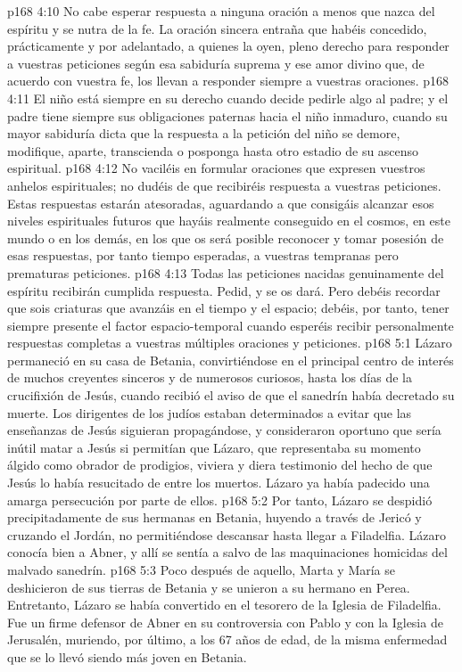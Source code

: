 \vs p168 4:10 No cabe esperar respuesta a ninguna oración a menos que nazca del espíritu y se nutra de la fe. La oración sincera entraña que habéis concedido, prácticamente y por adelantado, a quienes la oyen, pleno derecho para responder a vuestras peticiones según esa sabiduría suprema y ese amor divino que, de acuerdo con vuestra fe, los llevan a responder siempre a vuestras oraciones.
\vs p168 4:11 El niño está siempre en su derecho cuando decide pedirle algo al padre; y el padre tiene siempre sus obligaciones paternas hacia el niño inmaduro, cuando su mayor sabiduría dicta que la respuesta a la petición del niño se demore, modifique, aparte, transcienda o posponga hasta otro estadio de su ascenso espiritual.
\vs p168 4:12 No vaciléis en formular oraciones que expresen vuestros anhelos espirituales; no dudéis de que recibiréis respuesta a vuestras peticiones. Estas respuestas estarán atesoradas, aguardando a que consigáis alcanzar esos niveles espirituales futuros que hayáis realmente conseguido en el cosmos, en este mundo o en los demás, en los que os será posible reconocer y tomar posesión de esas respuestas, por tanto tiempo esperadas, a vuestras tempranas pero prematuras peticiones.
\vs p168 4:13 Todas las peticiones nacidas genuinamente del espíritu recibirán cumplida respuesta. Pedid, y se os dará. Pero debéis recordar que sois criaturas que avanzáis en el tiempo y el espacio; debéis, por tanto, tener siempre presente el factor espacio\hyp{}temporal cuando esperéis recibir personalmente respuestas completas a vuestras múltiples oraciones y peticiones.
\vs p168 5:1 Lázaro permaneció en su casa de Betania, convirtiéndose en el principal centro de interés de muchos creyentes sinceros y de numerosos curiosos, hasta los días de la crucifixión de Jesús, cuando recibió el aviso de que el sanedrín había decretado su muerte. Los dirigentes de los judíos estaban determinados a evitar que las enseñanzas de Jesús siguieran propagándose, y consideraron oportuno que sería inútil matar a Jesús si permitían que Lázaro, que representaba su momento álgido como obrador de prodigios, viviera y diera testimonio del hecho de que Jesús lo había resucitado de entre los muertos. Lázaro ya había padecido una amarga persecución por parte de ellos.
\vs p168 5:2 Por tanto, Lázaro se despidió precipitadamente de sus hermanas en Betania, huyendo a través de Jericó y cruzando el Jordán, no permitiéndose descansar hasta llegar a Filadelfia. Lázaro conocía bien a Abner, y allí se sentía a salvo de las maquinaciones homicidas del malvado sanedrín.
\vs p168 5:3 Poco después de aquello, Marta y María se deshicieron de sus tierras de Betania y se unieron a su hermano en Perea. Entretanto, Lázaro se había convertido en el tesorero de la Iglesia de Filadelfia. Fue un firme defensor de Abner en su controversia con Pablo y con la Iglesia de Jerusalén, muriendo, por último, a los 67 años de edad, de la misma enfermedad que se lo llevó siendo más joven en Betania.
